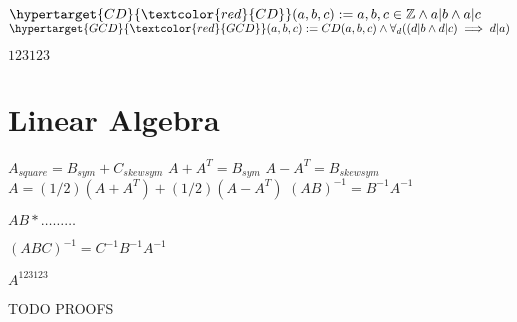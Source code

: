 \documentclass{book}
\newcommand{\df}[1]{\hypertarget{#1}{\textcolor{red}{#1}}}
\newcommand{\wff}[1]{\hypertarget{#1}{\fbox{\textcolor{red}{$#1$}}\phantom{--}}}
\newcommand{\abr}{:=}
\begin{document}
$\df{CD}(a, b, c) \abr a, b, c \in \mathbb{Z} \land a | b \land a | c$ \\
$\df{GCD}(a, b, c) \abr CD(a, b, c) \land \forall_{d}((d | b \land d | c) \implies d | a)$

\wff{GCD Equivalent} $123123$

\chapter{Linear Algebra}
$A_{square}  = B_{sym} + C_{skewsym}$
$A + A^T = B_{sym}$
$A - A^T = B_{skewsym}$
$A = (1/2) (A + A^T) + (1/2) (A - A^T)$
$(A B)^{-1} = B^{-1} A^{-1}$

$A B * \ldots \ldots \ldots$

$(A B C)^{-1} = C^{-1} B^{-1} A^{-1}$

$A^123123$

TODO PROOFS


\end{document}
